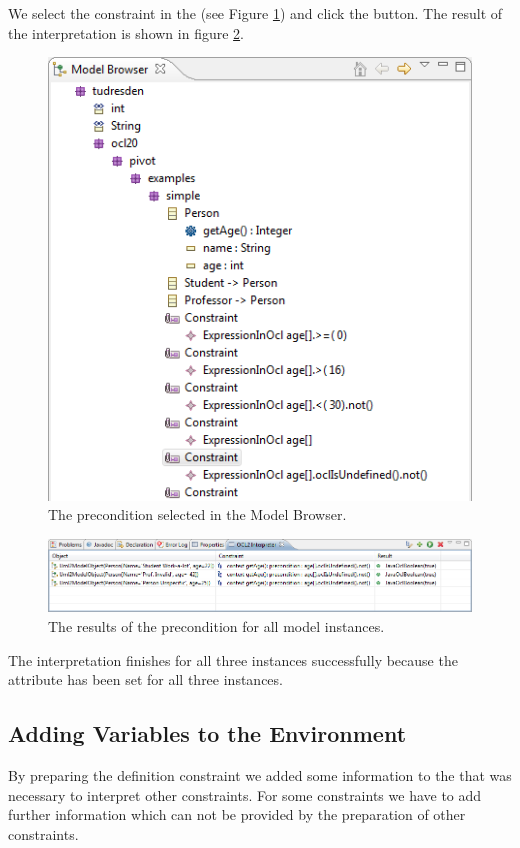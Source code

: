 We select the constraint in the  (see Figure \ref{pic:interpret:interpret06}) and click the  button. The result of the interpretation is shown in figure \ref{pic:interpret:interpret07}.

\begin{figure}[!htbp]
	\centering
	\includegraphics[width=0.7\linewidth]{figures/interpreter/interpret06}
	\caption{The precondition selected in the Model Browser.}
	\label{pic:interpret:interpret06}
\end{figure}

\begin{figure}[!htbp]
	\centering
	\includegraphics[width=1.0\linewidth]{figures/interpreter/interpret07}
	\caption{The results of the precondition for all model instances.}
	\label{pic:interpret:interpret07}
\end{figure}

The interpretation finishes for all three instances successfully because the attribute  has been set for all three instances.


\subsection{Adding Variables to the Environment}

By preparing the definition constraint we added some information to the  that was necessary to interpret other constraints. For some constraints we have to add further information which can not be provided by the preparation of other constraints.

